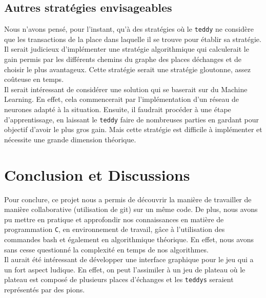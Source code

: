 \documentclass[12pt]{article}
\begin{document}
        \subsection{Autres stratégies envisageables}
        Nous n'avons pensé, pour l'instant, qu'à des stratégies où le \texttt{teddy} ne considère que les transactions de la place dans laquelle il se trouve pour établir sa stratégie. Il serait judicieux d'implémenter une stratégie algorithmique qui calculerait le gain permis par les différents chemins du graphe des places déchanges et de choisir le plus avantageux. Cette stratégie serait une stratégie gloutonne, assez coûteuse en temps.\\
  
        Il serait intéressant de considérer une solution qui se baserait sur du Machine Learning. En effet, cela commencerait par l'implémentation d'un réseau de neurones adapté à la situation. Ensuite, il faudrait procéder à une étape d'apprentissage, en laissant le \texttt{teddy} faire de nombreuses parties en gardant pour objectif d'avoir le plus gros gain. Mais cette stratégie est difficile à implémenter et nécessite une grande dimension théorique.
        \section{Conclusion et Discussions}
        Pour conclure, ce projet nous a permis de découvrir la manière de travailler de manière collaborative (utilisation de git) sur un même code. De plus, nous avons pu mettre en pratique et approfondir nos connaissances en matière de programmation \texttt{C}, en environnement de travail, gâce à l'utilisation des commandes bash et également en algorithmique théorique. En effet, nous avons sans cesse questionné la complexité en temps de nos algorithmes.\\
        
        Il aurait été intéressant de développer une interface graphique pour le jeu qui a un fort aspect ludique. En effet, on peut l'assimiler à un jeu de plateau où le plateau est composé de plusieurs places d'échanges et les \texttt{teddys} seraient représentés par des pions. 
        
\end{document}
